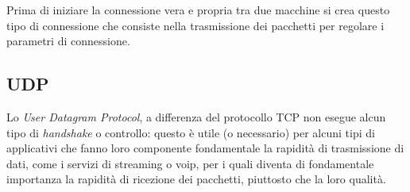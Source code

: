     Prima di iniziare la connessione vera e propria tra due macchine si crea questo tipo di connessione che consiste nella trasmissione dei pacchetti per regolare i parametri di connessione.

\subsection{UDP}
Lo \textit{User Datagram Protocol}, a differenza del protocollo TCP non esegue alcun tipo di \textit{handshake} o controllo: questo è utile (o necessario) per alcuni tipi di applicativi che fanno loro componente fondamentale la rapidità di trasmissione di dati, come i servizi di streaming o voip, per i quali diventa di fondamentale importanza la rapidità di ricezione dei pacchetti, piuttosto che la loro qualità.

